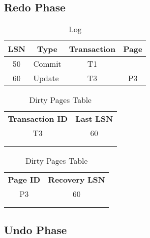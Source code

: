 \subsection{Redo Phase}

\begin{table}[H]
\centering
\begin{tabular}{|c|l|c|c|}
\hline
\textbf{LSN}           & \multicolumn{1}{c|}{\textbf{Type}} & \textbf{Transaction}  & \textbf{Page}         \\ \hline
50                     & Commit                             & T1                    &                       \\ \hline
60                     & Update                             & T3                    & P3                    \\ \hline
\end{tabular}
\caption{Log}
\end{table}

\begin{table}[H]
    \begin{minipage}{.5\linewidth}
      \centering
		\begin{tabular}{|c|c|}
		\cline{1-2}
		\textbf{Transaction ID} & \textbf{Last LSN} \\ \cline{1-2}
		T3             & 60       \\ \cline{1-2}
		               &          \\ \cline{1-2}
		               &          \\ \cline{1-2}
		\end{tabular}
      \caption{Active Transactions Table}

    \end{minipage}%
    \begin{minipage}{.5\linewidth}
      \centering
		\begin{tabular}{|c|c|}
		\cline{1-2}
		\textbf{Page ID} & \textbf{Recovery LSN} \\ \cline{1-2}
		P3      & 60           \\ \cline{1-2}
		        &              \\ \cline{1-2}
		        &              \\ \cline{1-2}
		\end{tabular}
        \caption{Dirty Pages Table}

    \end{minipage} 
\end{table}

\subsection{Undo Phase}

